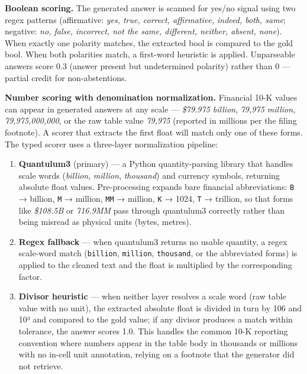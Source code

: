 \documentclass[
]{article}
\begin{document}
\textbf{Boolean scoring.} The generated answer is scanned for yes/no
signal using two regex patterns (affirmative: \emph{yes, true, correct,
affirmative, indeed, both, same}; negative: \emph{no, false, incorrect,
not the same, different, neither, absent, none}). When exactly one
polarity matches, the extracted bool is compared to the gold bool. When
both polarities match, a first-word heuristic is applied. Unparseable
answers score 0.3 (answer present but undetermined polarity) rather than
0 --- partial credit for non-abstentions.

\textbf{Number scoring with denomination normalization.} Financial 10-K
values can appear in generated answers at any scale --- \emph{\$79.975
billion}, \emph{79,975 million}, \emph{79,975,000,000}, or the raw table
value \emph{79,975} (reported in millions per the filing footnote). A
scorer that extracts the first float will match only one of these forms.
The typed scorer uses a three-layer normalization pipeline:

\begin{enumerate}
\def\labelenumi{\arabic{enumi}.}
\item
  \textbf{Quantulum3} (primary) --- a Python quantity-parsing library
  that handles scale words (\emph{billion}, \emph{million},
  \emph{thousand}) and currency symbols, returning absolute float
  values. Pre-processing expands bare financial abbreviations:
  \texttt{B} → billion, \texttt{M} → million, \texttt{MM} → million,
  \texttt{K} → 1024, \texttt{T} → trillion, so that forms like
  \emph{\$108.5B} or \emph{716.9MM} pass through quantulum3 correctly
  rather than being misread as physical units (bytes, metres).
\item
  \textbf{Regex fallback} --- when quantulum3 returns no usable
  quantity, a regex scale-word match (\texttt{billion},
  \texttt{million}, \texttt{thousand}, or the abbreviated forms) is
  applied to the cleaned text and the float is multiplied by the
  corresponding factor.
\item
  \textbf{Divisor heuristic} --- when neither layer resolves a scale
  word (raw table value with no unit), the extracted absolute float is
  divided in turn by 106 and 10³ and compared to the gold value; if any
  divisor produces a match within tolerance, the answer scores 1.0. This
  handles the common 10-K reporting convention where numbers appear in
  the table body in thousands or millions with no in-cell unit
  annotation, relying on a footnote that the generator did not retrieve.
\end{enumerate}
\end{document}
